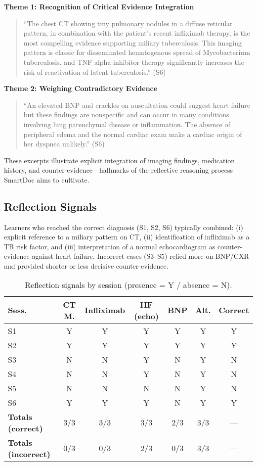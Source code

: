 \textbf{Theme 1: Recognition of Critical Evidence Integration}
\begin{quote}
``The chest CT showing tiny pulmonary nodules in a diffuse reticular pattern, in combination
with the patient's recent infliximab therapy, is the most compelling evidence supporting
miliary tuberculosis. This imaging pattern is classic for disseminated hematogenous spread
of Mycobacterium tuberculosis, and TNF alpha inhibitor therapy significantly increases the
risk of reactivation of latent tuberculosis.'' (S6)
\end{quote}

\textbf{Theme 2: Weighing Contradictory Evidence}
\begin{quote}
``An elevated BNP and crackles on auscultation could suggest heart failure but these findings
are nonspecific and can occur in many conditions involving lung parenchymal disease or
inflammation. The absence of peripheral edema and the normal cardiac exam make a cardiac
origin of her dyspnea unlikely.'' (S6)
\end{quote}

These excerpts illustrate explicit integration of imaging findings, medication history, and
counter-evidence—hallmarks of the reflective reasoning process SmartDoc aims to cultivate.

\subsection{Reflection Signals}
Learners who reached the correct diagnosis (S1, S2, S6) typically combined:
(i) explicit reference to a miliary pattern on CT,
(ii) identification of infliximab as a TB risk factor, and
(iii) interpretation of a normal echocardiogram as counter-evidence against heart failure.
Incorrect cases (S3–S5) relied more on BNP/CXR and provided shorter or less decisive
counter-evidence.

\newpage

\begin{table}[h]
\centering
\caption{Reflection signals by session (presence = Y / absence = N).}
\label{tab:reflection_summary}
\setlength{\tabcolsep}{6pt}
\renewcommand{\arraystretch}{1.1}
\begin{tabular}{lccccc c}
\toprule
\textbf{Sess.} &
\textbf{CT M.} &
\textbf{Infliximab} &
\textbf{HF (echo)} &
\textbf{BNP} &
\textbf{Alt.} &
\textbf{Correct} \\
\midrule
S1 & Y & Y & Y & Y & Y & Y \\
S2 & Y & Y & Y & Y & Y & Y \\
S3 & N & N & Y & N & Y & N \\
S4 & N & N & Y & N & Y & N \\
S5 & N & N & N & N & Y & N \\
S6 & Y & Y & Y & N & Y & Y \\
\midrule
\textbf{Totals (correct)}   & 3/3 & 3/3 & 3/3 & 2/3 & 3/3 & --- \\
\textbf{Totals (incorrect)} & 0/3 & 0/3 & 2/3 & 0/3 & 3/3 & --- \\
\bottomrule
\end{tabular}
\end{table}

